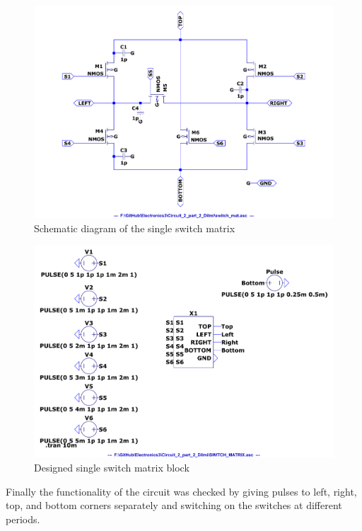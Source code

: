 \documentclass[a4paper,11pt]{article}%
\begin{document}
\begin{figure}[H]
	\centering
	\includegraphics[scale=0.4]{figures/2part2/switch_mat.pdf}
	\caption{Schematic diagram of the single switch matrix}
\end{figure}
\begin{figure}[H]
	\centering
	\includegraphics[scale=0.4]{figures/2part2/block.pdf}
	\caption{Designed single switch matrix block}
\end{figure}

Finally the functionality of the circuit was checked by giving pulses to left, right, top, and bottom corners separately and switching on the switches at different periods.
\end{document}
